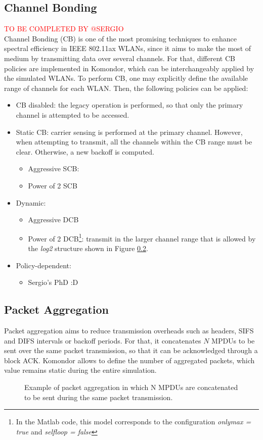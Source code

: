 \documentclass[a4paper]{article}
\begin{document}
	\subsection{Channel Bonding}
	\label{section:channel_bonding}
	\textcolor{red}{TO BE COMPLETED BY @SERGIO}\\
	Channel Bonding (CB) is one of the most promising techniques to enhance spectral efficiency in IEEE 802.11ax WLANs, since it aims to make the most of medium by transmitting data over several channels. For that, different CB policies are implemented in Komondor, which can be interchangeably applied by the simulated WLANs. To perform CB, one may explicitly define the available range of channels for each WLAN. Then, the following policies can be applied:
	\begin{itemize}
		\item CB disabled: the legacy operation is performed, so that only the primary channel is attempted to be accessed.
		\item Static CB: carrier sensing is performed at the primary channel. However, when attempting to transmit, all the channels within the CB range must be clear. Otherwise, a new backoff is computed.
		\begin{itemize}
		\item Aggressive SCB: 
		\item Power of 2 SCB
		\end{itemize}
		\item Dynamic:
		\begin{itemize}
			\item Aggressive DCB
			\item Power of 2 DCB\footnote{In the Matlab code, this model corresponds to the configuration \textit{onlymax = true} and \textit{selfloop = false}}: transmit in the larger channel range that is allowed by the \textit{log2} structure shown in Figure \ref{}.  
		\end{itemize}
		\item Policy-dependent:
		\begin{itemize}
			\item Sergio's PhD :D
		\end{itemize}
	\end{itemize}

	\subsection{Packet Aggregation}
	Packet aggregation aims to reduce transmission overheads such as headers, SIFS and DIFS intervals or backoff periods. For that, it concatenates $N$ MPDUs to be sent over the same packet transmission, so that it can be acknowledged through a block ACK. Komondor allows to define the number of aggregated packets, which value remains static during the entire simulation.
	\begin{figure}[h!]
		\centering
		\caption{Example of packet aggregation in which N MPDUs are concatenated to be sent during the same packet transmission.}
		\label{fig:ampdu}
	\end{figure}
	
\end{document}
